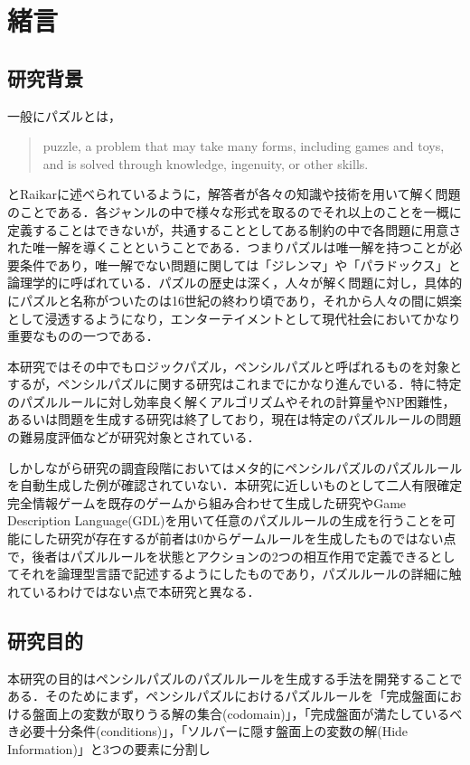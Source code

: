 \chapter{緒言}
\section{研究背景}
一般にパズルとは，
\begin{quote}
	puzzle, a problem that may take many forms, including games and toys, and is solved through knowledge, ingenuity, or other skills.
\end{quote}
とRaikar\cite{Raikar2022}に述べられているように，解答者が各々の知識や技術を用いて解く問題のことである．各ジャンルの中で様々な形式を取るのでそれ以上のことを一概に定義することはできないが，共通することとしてある制約の中で各問題に用意された唯一解を導くことということである．つまりパズルは唯一解を持つことが必要条件であり，唯一解でない問題に関しては「ジレンマ」や「パラドックス」と論理学的に呼ばれている\cite{web:puzzle}．パズルの歴史は深く，人々が解く問題に対し，具体的にパズルと名称がついたのは16世紀の終わり頃であり，それから人々の間に娯楽として浸透するようになり，エンターテイメントとして現代社会においてかなり重要なものの一つである．

本研究ではその中でもロジックパズル，ペンシルパズルと呼ばれるものを対象とするが，ペンシルパズルに関する研究はこれまでにかなり進んでいる．特に特定のパズルルールに対し効率良く解くアルゴリズムやそれの計算量やNP困難性，あるいは問題を生成する研究は終了しており，現在は特定のパズルルールの問題の難易度評価などが研究対象とされている．

しかしながら研究の調査段階においてはメタ的にペンシルパズルのパズルルールを自動生成した例が確認されていない．本研究に近しいものとして二人有限確定完全情報ゲームを既存のゲームから組み合わせて生成した研究やGame Description Language(GDL)を用いて任意のパズルルールの生成を行うことを可能にした研究が存在するが前者は0からゲームルールを生成したものではない点で，後者はパズルルールを状態とアクションの2つの相互作用で定義できるとしてそれを論理型言語で記述するようにしたものであり，パズルルールの詳細に触れているわけではない点で本研究と異なる．


\section{研究目的}
本研究の目的はペンシルパズルのパズルルールを生成する手法を開発することである．そのためにまず，ペンシルパズルにおけるパズルルールを「完成盤面における盤面上の変数が取りうる解の集合(codomain)」，「完成盤面が満たしているべき必要十分条件(conditions)」，「ソルバーに隠す盤面上の変数の解(Hide Information)」と3つの要素に分割し

